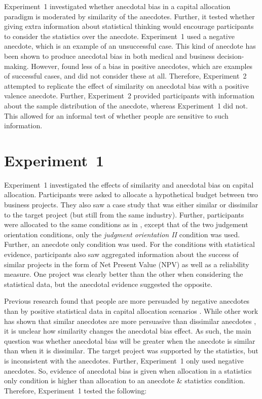 \documentclass[a4paper, nobind, dvipsnames]{templates/ociamthesis}
\theoremstyle{definition}
\theoremstyle{definition}
\theoremstyle{definition}
\theoremstyle{definition}
\theoremstyle{remark}
\begin{document}
Experiment~1 investigated whether anecdotal bias in a capital allocation
paradigm is moderated by similarity of the anecdotes. Further, it tested whether
giving extra information about statistical thinking would encourage participants
to consider the statistics over the anecdote. Experiment~1 used a negative
anecdote, which is an example of an unsuccessful case. This kind of anecdote has
been shown to produce anecdotal bias in both medical \autocite{jaramillo2019} and
business \autocite{wainberg2018} decision-making. However, \textcite{jaramillo2019} found less of
a bias in positive anecdotes, which are examples of successful cases, and
\textcite{wainberg2018} did not consider these at all. Therefore, Experiment~2 attempted
to replicate the effect of similarity on anecdotal bias with a positive valence
anecdote. Further, Experiment~2 provided participants with information about the
sample distribution of the anecdote, whereas Experiment~1 did not. This allowed
for an informal test of whether people are sensitive to such information.

\hypertarget{anecdotes-1}{%
\section{Experiment~1}\label{anecdotes-1}}

Experiment~1 investigated the effects of similarity and anecdotal bias on
capital allocation. Participants were asked to allocate a hypothetical budget
between two business projects. They also saw a case study that was either
similar or dissimilar to the target project (but still from the same industry).
Further, participants were allocated to the same conditions as in \textcite{wainberg2018},
except that of the two judgement orientation conditions, only the \emph{judgment
orientation II} condition was used. Further, an anecdote only condition was
used. For the conditions with statistical evidence, participants also saw
aggregated information about the success of similar projects in the form of Net
Present Value (NPV) as well as a reliability measure. One project was clearly
better than the other when considering the statistical data, but the anecdotal
evidence suggested the opposite.

Previous research found that people are more persuaded by negative anecdotes
than by positive statistical data in capital allocation scenarios
\autocite{wainberg2018}. While other work has shown that similar anecdotes are more
persuasive than dissimilar anecdotes \autocite[Study 3]{hoeken2009}, it is unclear how
similarity changes the anecdotal bias effect. As such, the main question was
whether anecdotal bias will be greater when the anecdote is similar than when it
is dissimilar. The target project was supported by the statistics, but is
inconsistent with the anecdotes. Further, Experiment~1 only used negative
anecdotes. So, evidence of anecdotal bias is given when allocation in a
statistics only condition is higher than allocation to an anecdote \& statistics
condition. Therefore, Experiment~1 tested the following:
\end{document}
